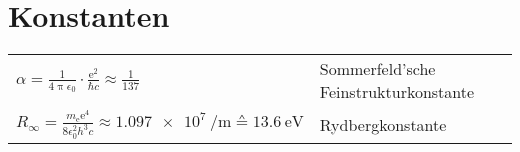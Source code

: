 \section{Konstanten}
\bgroup
\def\arraystretch{1.5}
\begin{tabular}{l|l}
	$\alpha = \frac{1}{4 \uppi \epsilon_0} \cdot \frac{\text{e}^2}{\hbar c} \approx \frac{1}{137}$&	Sommerfeld'sche Feinstrukturkonstante\\
	\hdashline
	$R_\infty = \frac{m_\text{e} \text{e}^4}{8 \epsilon_0^2 h^3 c} \approx \SI{1.097e7}{\per\meter} \corresponds \SI{13.6}{\eV}$&	Rydbergkonstante\\
\end{tabular}
\egroup

